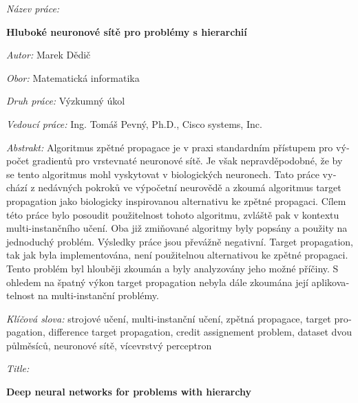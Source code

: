 \begin{czech}
	\begin{onehalfspace}
		\noindent \textit{Název práce:}

		\noindent \textbf{Hluboké neuronové sítě pro problémy s hierarchií}
	\end{onehalfspace}

	\bigskip

	\noindent \textit{Autor:} Marek Dědič

	\bigskip

	\noindent \textit{Obor:} Matematická informatika

	\bigskip

	\noindent \textit{Druh práce:} Výzkumný úkol

	\bigskip

	\noindent \textit{Vedoucí práce:} Ing. Tomáš Pevný, Ph.D., Cisco systems, Inc.

	\bigskip

	\noindent \textit{Abstrakt:}
	Algoritmus zpětné propagace je v praxi standardním přístupem pro výpočet gradientů pro vrstevnaté neuronové sítě. Je však nepravděpodobné, že by se tento algoritmus mohl vyskytovat v biologických neuronech. Tato práce vychází z nedávných pokroků ve výpočetní neurovědě a zkoumá algoritmus target propagation jako biologicky inspirovanou alternativu ke zpětné propagaci. Cílem této práce bylo posoudit použitelnost tohoto algoritmu, zvláště pak v kontextu multi-instančního učení. Oba již zmiňované algoritmy byly popsány a použity na jednoduchý problém. Výsledky práce jsou převážně negativní. Target propagation, tak jak byla implementována, není použitelnou alternativou ke zpětné propagaci. Tento problém byl hlouběji zkoumán a byly analyzovány jeho možné příčiny. S ohledem na špatný výkon target propagation nebyla dále zkoumána její aplikovatelnost na multi-instanční problémy.

	\bigskip

	\noindent \textit{Klíčová slova:}
	strojové učení, multi-instanční učení, zpětná propagace, target propagation, difference target propagation, credit assignement problem, dataset dvou půlměsíců, neuronové sítě, vícevrstvý perceptron
\end{czech}

\vfill

\begin{onehalfspace}
	\noindent \textit{Title:}

	\noindent \textbf{Deep neural networks for problems with hierarchy}
\end{onehalfspace}

